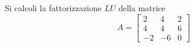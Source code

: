 Si calcoli la fattorizzazione $LU$ della matrice
\bigskip
\[
A=\left[
\begin{array}{ccc}
2 & 4 & 2 \\
4 & 4 & 6\\
-2 & -6 & 0
\end{array}\right]
\]

